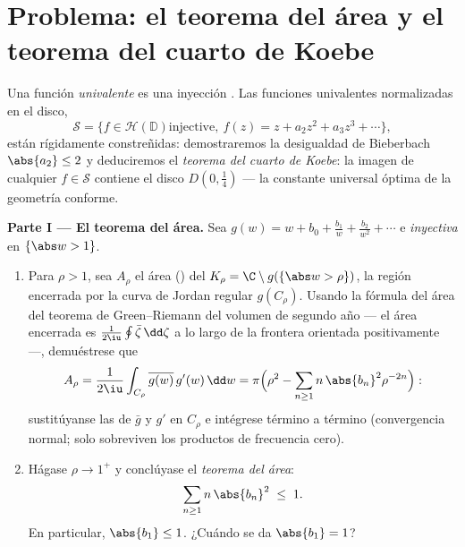 \section{Problema: el teorema del área y el teorema del cuarto
de Koebe}

\begin{problem}\label{pb:b3:conformal:1} Una función
\emph{univalente} es una inyección
. Las funciones univalentes
normalizadas en el disco,
\[
\mathcal S = \bigl\{f \in \mathcal H(\mathbb D) \text{
injective},\ f(z) = z + a_2z^2 + a_3z^3 + \cdots\bigr\},
\]
están rígidamente constreñidas: demostraremos la desigualdad de
Bieberbach $\abs{a_2} \leq 2$ y deduciremos el \emph{teorema del cuarto
de Koebe}: la imagen de cualquier $f \in \mathcal S$ contiene el disco
$D(0, \frac14)$ --- la constante universal óptima de la geometría
conforme.

\medskip
\noindent\textbf{Parte I --- El teorema del área.} Sea $g(w) = w
+ b_0 + \frac{b_1}w + \frac{b_2}{w^2} + \cdots$
 e \emph{inyectiva} en
$\{\abs w > 1\}$.
\begin{enumerate}
  \item Para $\rho > 1$, sea $A_\rho$ el área
  () del
   $K_\rho = \C\setminus
        g(\{\abs w > \rho\})$, la región encerrada por la curva de
  Jordan regular $g(C_\rho)$. Usando la fórmula del área del teorema de
  Green--Riemann del volumen de segundo año --- el área encerrada es
  $\frac1{2\iu}
        \oint\bar\zeta\,\dd\zeta$ a lo largo de la frontera orientada
  positivamente ---, demuéstrese que
        \[
        A_\rho = \frac{1}{2\iu}\int_{C_\rho}
        \overline{g(w)}\,g'(w)\,\dd w
        = \pi\Bigl(\rho^2 -
        \sum_{n\geq1}n\,\abs{b_n}^2\rho^{-2n}\Bigr) :
        \]
        sustitúyanse las  de $\bar g$ y $g'$ en $C_\rho$ e intégrese término a
        término (convergencia normal; solo sobreviven los productos de
        frecuencia cero). \item Hágase $\rho \to 1^+$ y conclúyase el
        \emph{teorema del área}:
        \[
        \sum_{n\geq1}n\,\abs{b_n}^2 \;\leq\; 1 .
        \]
        En particular, $\abs{b_1} \leq 1$. ¿Cuándo se da $\abs{b_1}
        = 1$?
\end{enumerate}


\end{problem}
